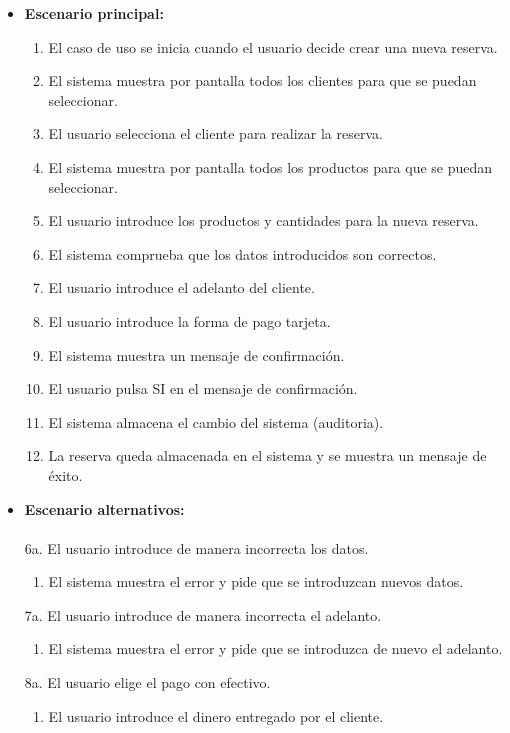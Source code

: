 \begin{itemize}\renewcommand{\labelitemi}{$\circ$}
 \item \textbf{Escenario principal:}
         \begin{enumerate}
          \item El caso de uso se inicia cuando el usuario decide crear una nueva reserva.
	\item El sistema muestra por pantalla todos los clientes para que se puedan seleccionar.
	\item El usuario selecciona el cliente para realizar la reserva.
	\item El sistema muestra por pantalla todos los productos para que se puedan seleccionar.
          \item El usuario introduce los productos y cantidades para la nueva reserva.
	  \item El sistema comprueba que los datos introducidos son correctos.
	 \item El usuario introduce el adelanto del cliente.
	  \item El usuario introduce la forma de pago tarjeta.
  	  \item El sistema muestra un mensaje de confirmación.
          \item El usuario pulsa SI en el mensaje de confirmación.
 	  \item El sistema almacena el cambio del sistema (auditoria).
          \item La reserva queda almacenada en el sistema y se muestra un mensaje de éxito.
         \end{enumerate}
  \item \textbf{Escenario alternativos:}\\\\
	  6a. El usuario introduce de manera incorrecta los datos.
		\begin{enumerate}
		 \item El sistema muestra el error y pide que se introduzcan nuevos datos.
		\end{enumerate}
	7a. El usuario introduce de manera incorrecta el adelanto.
		\begin{enumerate}
		 \item El sistema muestra el error y pide que se introduzca de nuevo el adelanto.
		\end{enumerate}
	8a. El usuario elige el pago con efectivo.
		\begin{enumerate}
		\item El usuario introduce el dinero entregado por el cliente.

\end{enumerate}
\end{itemize}
